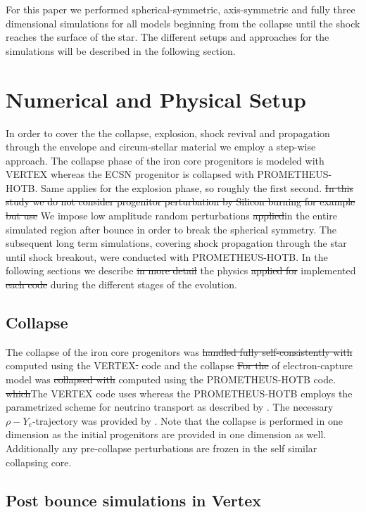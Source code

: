 \documentclass[fleqn,usenatbib]{mnras}
\newcommand{\prom}{\textsc{P{\footnotesize ROMETHEUS}-H{\footnotesize OT}B}\xspace}
\newcommand{\vertex}{\textsc{V{\footnotesize ERTEX}}\xspace}
\newcommand{\NY}[2]{{\color{blue}\sout{#1}#2}}
\begin{document}
For this paper we performed spherical-symmetric, axis-symmetric and fully three dimensional simulations for all models beginning from the collapse until the shock reaches the surface of the star. The different setups and approaches for the simulations will be described in the following section.

\section{Numerical and Physical Setup}
\label{sec:explosionModeling}
In order to cover the the collapse, explosion, shock revival and propagation through the envelope and circum-stellar material we employ a step-wise approach.
The collapse phase of the iron core progenitors is modeled with \vertex whereas the ECSN progenitor is collapsed with \prom.
Same applies for the explosion phase, so roughly the first second. \NY{In this study we do not consider progenitor perturbation by Silicon burning for example but use}{ We impose} low amplitude random perturbations \NY{applied}{in the entire simulated region} after bounce \NY{}{in order} to break the spherical symmetry. 
The subsequent long term simulations, covering shock propagation through the star until shock breakout, were conducted with \prom.
In the following \NY{}{sections} we describe \NY{in more detail}{} the physics \NY{applied for}{ implemented} \NY{each code}{} during the different stages of the evolution.

\subsection{Collapse}
The collapse of the iron core progenitors was \NY{handled fully self-consistently with}{ computed using the} \vertex\NY{.}{ code and the collapse} \NY{For the}{ of} electron-capture model was \NY{collapsed with}{ computed using the} \prom\NY{}{ code.} \NY{which}{The \vertex code uses  whereas the \prom} employs \NY{}{the} parametrized scheme \NY{}{for neutrino transport as described} by \citet{Liebendoerfer2005}. The necessary $\rho-Y_{e}$-trajectory was provided by \cite{Huedepohl2018}.
Note that the collapse is performed in one dimension as the initial progenitors are provided in one dimension as well. Additionally any pre-collapse perturbations are frozen in the self similar collapsing core. 

\subsection{Post bounce simulations in Vertex}
\end{document}
